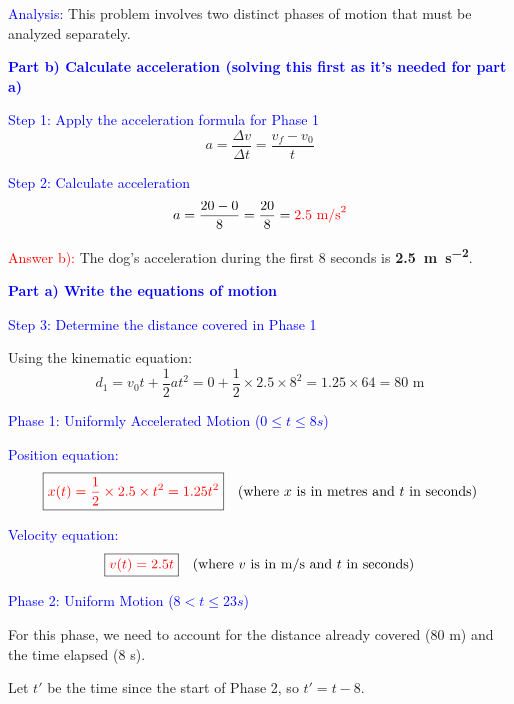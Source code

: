 \begin{exercise}
\begin{solu}
        \textcolor{blue}{Analysis:} This problem involves two distinct phases of motion that must be analyzed separately.

        \vspace{0.3cm}

        \textbf{\textcolor{blue}{Part b) Calculate acceleration (solving this first as it's needed for part a)}}

        \textcolor{blue}{Step 1: Apply the acceleration formula for Phase 1}
        \[
            \boxed{a = \frac{\Delta v}{\Delta t} = \frac{v_f - v_0}{t}}
        \]

        \textcolor{blue}{Step 2: Calculate acceleration}
        \[
            a = \frac{20 - 0}{8} = \frac{20}{8} = \textcolor{red}{2.5 \text{ m/s}^2}
        \]

        \textcolor{red}{Answer b):} The dog's acceleration during the first 8 seconds is \textbf{\qty{2.5}{\metre\per\second\squared}}.

        \vspace{0.5cm}

        \textbf{\textcolor{blue}{Part a) Write the equations of motion}}

        \textcolor{blue}{Step 3: Determine the distance covered in Phase 1}

        Using the kinematic equation:
        \[
            d_1 = v_0 t + \frac{1}{2}at^2 = 0 + \frac{1}{2} \times 2.5 \times 8^2 = 1.25 \times 64 = 80 \text{ m}
        \]

        \textcolor{blue}{Phase 1: Uniformly Accelerated Motion ($0 \leq t \leq 8 s$)}

        \textcolor{blue}{Position equation:}
        \[
            \boxed{\textcolor{red}{x(t) = \frac{1}{2} \times 2.5 \times t^2 = 1.25t^2}} \quad \text{(where $x$ is in metres and $t$ in seconds)}
        \]

        \textcolor{blue}{Velocity equation:}
        \[
            \boxed{\textcolor{red}{v(t) = 2.5t}} \quad \text{(where $v$ is in m/s and $t$ in seconds)}
        \]

        \vspace{0.3cm}

        \textcolor{blue}{Phase 2: Uniform Motion ($8 < t \leq 23 s$)}

        For this phase, we need to account for the distance already covered (80 m) and the time elapsed (8 s).

        Let $t'$ be the time since the start of Phase 2, so $t' = t - 8$.


\end{solu}
\end{exercise}
